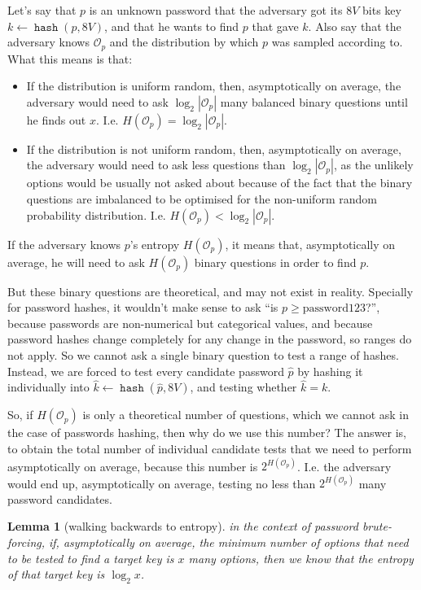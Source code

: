 \documentclass[twocolumn]{article}
\newtheorem{lemma}{Lemma}[section]
\DeclareMathOperator{\hash}{\mathtt{hash}}
\begin{document}
Let's say that $p$ is an unknown password that the adversary got its $8V$
bits key $k \gets \hash(p, 8V)$, and that he wants to find $p$ that gave
$k$.  Also say that the adversary knows $\mathcal{O}_p$ and the
distribution by which $p$ was sampled according to.  What this means is
that:
\begin{itemize}
    \item If the distribution is uniform random, then, asymptotically on
    average, the adversary would need to ask $\log_2 |\mathcal{O}_p|$ many
    balanced binary questions until he finds out $x$.  I.e.
    $H(\mathcal{O}_p) = \log_2 |\mathcal{O}_p|$.

    \item If the distribution is not uniform random, then, asymptotically
    on average, the adversary would need to ask less questions than $\log_2
    |\mathcal{O}_p|$, as the unlikely options would be usually not asked
    about because of the fact that the binary questions are imbalanced to
    be optimised for the non-uniform random probability distribution.  I.e.
    $H(\mathcal{O}_p) < \log_2 |\mathcal{O}_p|$.
\end{itemize}

If the adversary knows $p$'s entropy $H(\mathcal{O}_p)$, it means that,
asymptotically on average, he will need to ask $H(\mathcal{O}_p)$ binary
questions in order to find $p$.

But these binary questions are theoretical, and may not exist in reality.
Specially for password hashes, it wouldn't make sense to ask ``is $p \ge
\text{password123}$?'', because passwords are non-numerical but
categorical values, and because password hashes change completely for any
change in the password, so ranges do not apply.  So we cannot ask a single
binary question to test a range of hashes.  Instead, we are forced to test
every candidate password $\hat p$ by hashing it individually into $\hat k
\gets \hash(\hat p, 8V)$, and testing whether $\hat k = k$.

So, if $H(\mathcal{O}_p)$ is only a theoretical number of questions, which
we cannot ask in the case of passwords hashing, then why do we use this
number?  The answer is, to obtain the total number of individual candidate
tests that we need to perform asymptotically on average, because this
number is $2^{H(\mathcal{O}_p)}$.   I.e. the adversary would end up,
asymptotically on average, testing no less than $2^{H(\mathcal{O}_p)}$ many
password candidates.

\begin{lemma}[walking backwards to
entropy]\label{theorem_back_to_entropy}
    in the context of password brute-forcing, if, asymptotically on
    average, the minimum number of options that need to be tested to find a
    target key is $x$ many options, then we know that the entropy of that
    target key is $\log_2 x$.
\end{lemma}
\end{document}
